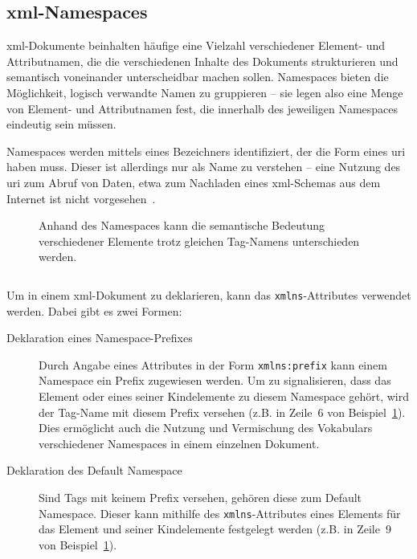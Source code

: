 \subsection{\acrshort{xml}-Namespaces}
\label{sec:xmlns}

\acrshort{xml}-Dokumente beinhalten häufige eine Vielzahl verschiedener Element- und Attributnamen, die die verschiedenen Inhalte des Dokuments strukturieren und semantisch voneinander unterscheidbar machen sollen. Namespaces bieten die Möglichkeit, logisch verwandte Namen zu gruppieren -- sie legen also eine Menge von Element- und Attributnamen fest, die innerhalb des jeweiligen Namespaces eindeutig sein müssen.

Namespaces werden mittels eines Bezeichners identifiziert, der die Form eines \gls{uri} haben muss. Dieser ist allerdings nur als Name zu verstehen -- eine Nutzung des \gls{uri} zum Abruf von Daten, etwa zum Nachladen eines \acrshort{xml}-Schemas aus dem Internet ist nicht vorgesehen~\cite[Abschn.~3]{xmlns}.

\begin{figure}[h]
    \begin{example}
        \label{ex:xmlns}
        Anhand des Namespaces kann die semantische Bedeutung verschiedener Elemente trotz gleichen Tag-Namens unterschieden werden.
        \inputminted[firstline=2,firstnumber=1]{xml}{ex-xmlns.xml}
    \end{example}
\end{figure}

Um in einem \acrshort{xml}-Dokument zu deklarieren, kann das \texttt{xmlns}-Attributes verwendet werden. Dabei gibt es zwei Formen:

\begin{description}
    \item[Deklaration eines Namespace-Prefixes] Durch Angabe eines Attributes in der Form \texttt{xmlns:prefix} kann einem Namespace ein Prefix zugewiesen werden. Um zu signalisieren, dass das Element oder eines seiner Kindelemente zu diesem Namespace gehört, wird der Tag-Name mit diesem Prefix versehen (z.B. in Zeile~6 von Beispiel~\ref{ex:xmlns}). Dies ermöglicht auch die Nutzung und Vermischung des Vokabulars verschiedener Namespaces in einem einzelnen Dokument.
    \item[Deklaration des Default Namespace] Sind Tags mit keinem Prefix versehen, gehören diese zum Default Namespace. Dieser kann mithilfe des \texttt{xmlns}-Attributes eines Elements für das Element und seiner Kindelemente festgelegt werden (z.B. in Zeile~9 von Beispiel~\ref{ex:xmlns}).
\end{description}

